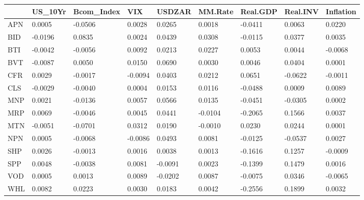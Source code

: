 \documentclass[11pt,preprint, authoryear]{elsarticle}
\let\origtable\table
\let\endorigtable\endtable
\renewenvironment{table}[1][2] {
    \expandafter\origtable\expandafter[H]
} {
    \endorigtable
}
\numberwithin{equation}{section}
\numberwithin{figure}{section}
\numberwithin{table}{section}
\begin{document}
\begin{table}[H]

\caption{\label{tab:Beta_I}Factor Beta's: Industrial}
\centering
\begin{tabular}[t]{l|l|l|l|l|l|l|l|l}
\hline
  & US\_10Yr & Bcom\_Index & VIX & USDZAR & MM.Rate & Real.GDP & Real.INV & Inflation\\
\hline
APN & 0.0005 & -0.0506 & 0.0028 & 0.0265 & 0.0018 & -0.0411 & 0.0063 & 0.0220\\
\hline
BID & -0.0196 & 0.0835 & 0.0024 & 0.0439 & 0.0308 & -0.0115 & 0.0377 & 0.0035\\
\hline
BTI & -0.0042 & -0.0056 & 0.0092 & 0.0213 & 0.0227 & 0.0053 & 0.0044 & -0.0068\\
\hline
BVT & -0.0087 & 0.0050 & 0.0150 & 0.0690 & 0.0030 & 0.0046 & 0.0404 & 0.0001\\
\hline
CFR & 0.0029 & -0.0017 & -0.0094 & 0.0403 & 0.0212 & 0.0651 & -0.0622 & -0.0011\\
\hline
CLS & -0.0029 & -0.0040 & 0.0004 & 0.0153 & 0.0116 & -0.0488 & 0.0009 & 0.0089\\
\hline
MNP & 0.0021 & -0.0136 & 0.0057 & 0.0566 & 0.0135 & -0.0451 & -0.0305 & 0.0002\\
\hline
MRP & 0.0069 & -0.0046 & 0.0045 & 0.0441 & -0.0104 & -0.2065 & 0.1566 & 0.0037\\
\hline
MTN & -0.0051 & -0.0701 & 0.0312 & 0.0190 & -0.0010 & 0.0230 & 0.0244 & 0.0001\\
\hline
NPN & 0.0005 & -0.0068 & -0.0086 & 0.0493 & 0.0081 & -0.0125 & -0.0537 & 0.0027\\
\hline
SHP & 0.0026 & -0.0013 & 0.0016 & 0.0038 & 0.0013 & -0.1616 & 0.1257 & -0.0009\\
\hline
SPP & 0.0048 & -0.0038 & 0.0081 & -0.0091 & 0.0023 & -0.1399 & 0.1479 & 0.0016\\
\hline
VOD & 0.0005 & 0.0013 & 0.0089 & -0.0202 & 0.0087 & -0.0075 & 0.0346 & -0.0065\\
\hline
WHL & 0.0082 & 0.0223 & 0.0030 & 0.0183 & 0.0042 & -0.2556 & 0.1899 & 0.0032\\
\hline
\end{tabular}
\end{table}
\end{document}
